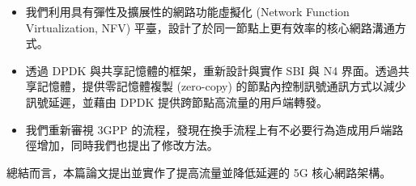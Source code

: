 \begin{itemize}
\item 我們利用具有彈性及擴展性的網路功能虛擬化 (Network Function Virtualization, NFV) 平臺，設計了於同一節點上更有效率的核心網路溝通方式。
\item 透過 DPDK 與共享記憶體的框架，重新設計與實作 SBI 與 N4 界面。透過共享記憶體，提供零記憶體複製 (zero-copy) 的節點內控制訊號通訊方式以減少訊號延遲，並藉由 DPDK 提供跨節點高流量的用戶端轉發。
\item 我們重新審視 3GPP 的流程，發現在換手流程上有不必要行為造成用戶端路徑增加，同時我們也提出了修改方法。
\end{itemize}

總結而言，本篇論文提出並實作了提高流量並降低延遲的 5G 核心網路架構。
